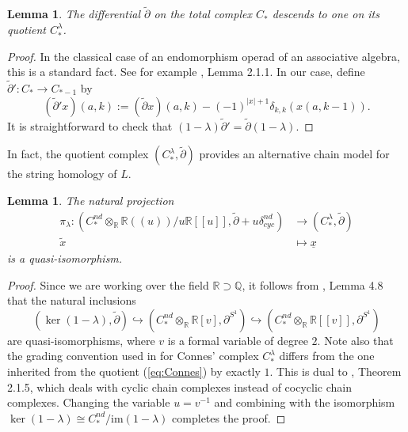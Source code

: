 \documentclass[a4paper]{article}
\newtheorem{lemma}[theorem]{Lemma}
\numberwithin{equation}{section}
\begin{document}
\begin{lemma}
The differential $\tilde{\partial}$ on the total complex $C_\ast$ descends to one on its quotient $C_\ast^\lambda$.
\end{lemma}
\begin{proof}
In the classical case of an endomorphism operad of an associative algebra, this is a standard fact. See for example \cite{jl}, Lemma 2.1.1. In our case, define $\tilde{\partial}':C_\ast\rightarrow C_{\ast-1}$ by
\begin{equation}
(\tilde{\partial}'x)(a,k):=(\tilde{\partial}x)(a,k)-(-1)^{|x|+1}\delta_{k,k}(x(a,k-1)).
\end{equation}
It is straightforward to check that $(1-\lambda)\tilde{\partial}'=\tilde{\partial}(1-\lambda)$.
\end{proof}

In fact, the quotient complex $(C_\ast^\lambda,\tilde{\partial})$ provides an alternative chain model for the string homology of $L$.
\begin{lemma}
The natural projection
\begin{equation}
\begin{split}
\pi_\lambda:\left(C_\ast^\mathit{nd}\otimes_\mathbb{R}\mathbb{R}(\!(u)\!)/u\mathbb{R}[\![u]\!],\tilde{\partial}+u\delta_\mathit{cyc}^\mathit{nd}\right)&\rightarrow(C_\ast^\lambda,\tilde{\partial}) \\
\tilde{x}&\mapsto\underline{x}
\end{split}
\end{equation}
is a quasi-isomorphism. 
\end{lemma}
\begin{proof}
Since we are working over the field $\mathbb{R}\supset\mathbb{Q}$, it follows from \cite{cv8}, Lemma 4.8 that the natural inclusions
\begin{equation}\label{eq:qis}
\left(\ker(1-\lambda),\tilde{\partial}\right)\hookrightarrow\left(C_\ast^\mathit{nd}\otimes_\mathbb{R}\mathbb{R}[v],\partial^{S^1}\right)\hookrightarrow\left(C_\ast^\mathit{nd}\otimes_\mathbb{R}\mathbb{R}[\![v]\!],\partial^{S^1}\right)
\end{equation}
are quasi-isomorphisms, where $v$ is a formal variable of degree $2$. Note also that the grading convention used in \cite{cv8} for Connes' complex $C_\ast^\lambda$ differs from the one inherited from the quotient (\ref{eq:Connes}) by exactly $1$. This is dual to \cite{jl}, Theorem 2.1.5, which deals with cyclic chain complexes instead of cocyclic chain complexes. Changing the variable $u=v^{-1}$ and combining with the isomorphism $\ker(1-\lambda)\cong C_\ast^\mathit{nd}/\mathrm{im}(1-\lambda)$ completes the proof.
\end{proof}
\end{document}
